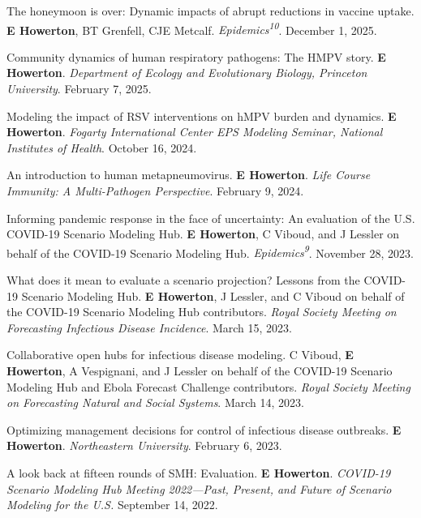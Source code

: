 \begin{cvnumbered}
  \item The honeymoon is over: Dynamic impacts of abrupt reductions in vaccine uptake. \textbf{E Howerton\cvstar}, BT Grenfell, CJE Metcalf. \textit{Epidemics\textsuperscript{10}}. December 1, 2025.

  \item Community dynamics of human respiratory pathogens: The HMPV story. \textbf{E Howerton\cvstar}. \textit{Department of Ecology and Evolutionary Biology, Princeton University}. February 7, 2025.

  \item Modeling the impact of RSV interventions on hMPV burden and dynamics. \textbf{E Howerton\cvstar}. \textit{Fogarty International Center EPS Modeling Seminar, National Institutes of Health}. October 16, 2024.

  \item An introduction to human metapneumovirus. \textbf{E Howerton\cvstar}. \textit{Life Course Immunity: A Multi-Pathogen Perspective}. February 9, 2024.

  \item Informing pandemic response in the face of uncertainty: An evaluation of the U.S. COVID-19 Scenario Modeling Hub. \textbf{E Howerton\cvstar}, C Viboud, and J Lessler on behalf of the COVID-19 Scenario Modeling Hub. \textit{Epidemics\textsuperscript{9}}. November 28, 2023.

  \item What does it mean to evaluate a scenario projection? Lessons from the COVID-19 Scenario Modeling Hub. \textbf{E Howerton\cvstar}, J Lessler, and C Viboud on behalf of the COVID-19 Scenario Modeling Hub contributors. \textit{Royal Society Meeting on Forecasting Infectious Disease Incidence}. March 15, 2023.

  \item Collaborative open hubs for infectious disease modeling. C Viboud\cvstar, \textbf{E Howerton}, A Vespignani, and J Lessler on behalf of the COVID-19 Scenario Modeling Hub and Ebola Forecast Challenge contributors. \textit{Royal Society Meeting on Forecasting Natural and Social Systems}. March 14, 2023.

  \item Optimizing management decisions for control of infectious disease outbreaks. \textbf{E Howerton\cvstar}. \textit{Northeastern University}. February 6, 2023.

  \item A look back at fifteen rounds of SMH: Evaluation. \textbf{E Howerton\cvstar}. \textit{COVID-19 Scenario Modeling Hub Meeting 2022---Past, Present, and Future of Scenario Modeling for the U.S.} September 14, 2022.


\end{cvnumbered}
